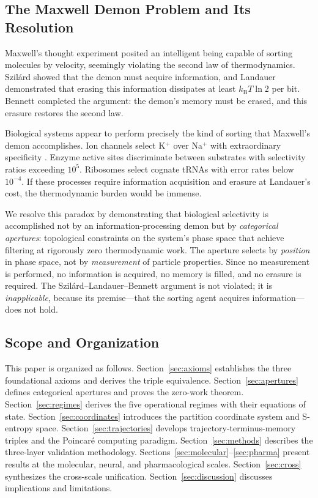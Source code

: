 \documentclass[twocolumn,10pt]{article}
\newcommand{\kB}{k_{\mathrm{B}}}
\begin{document}
\subsection{The Maxwell Demon Problem and Its Resolution}

Maxwell's thought experiment \citep{maxwell1871theory} posited an intelligent being capable of sorting molecules by velocity, seemingly violating the second law of thermodynamics.  Szil\'ard \citep{szilard1929entropieverminderung} showed that the demon must acquire information, and Landauer \citep{landauer1961irreversibility} demonstrated that erasing this information dissipates at least $\kB T \ln 2$ per bit.  Bennett \citep{bennett1982thermodynamics} completed the argument: the demon's memory must be erased, and this erasure restores the second law.

Biological systems appear to perform precisely the kind of sorting that Maxwell's demon accomplishes.  Ion channels select K$^{+}$ over Na$^{+}$ with extraordinary specificity \citep{doyle1998structure, hille2001ion}.  Enzyme active sites discriminate between substrates with selectivity ratios exceeding $10^{5}$.  Ribosomes select cognate tRNAs with error rates below $10^{-4}$.  If these processes require information acquisition and erasure at Landauer's cost, the thermodynamic burden would be immense.

We resolve this paradox by demonstrating that biological selectivity is accomplished not by an information-processing demon but by \emph{categorical apertures}: topological constraints on the system's phase space that achieve filtering at rigorously zero thermodynamic work.  The aperture selects by \emph{position} in phase space, not by \emph{measurement} of particle properties.  Since no measurement is performed, no information is acquired, no memory is filled, and no erasure is required.  The Szil\'ard--Landauer--Bennett argument is not violated; it is \emph{inapplicable}, because its premise---that the sorting agent acquires information---does not hold.

\subsection{Scope and Organization}

This paper is organized as follows.  Section~\ref{sec:axioms} establishes the three foundational axioms and derives the triple equivalence.  Section~\ref{sec:apertures} defines categorical apertures and proves the zero-work theorem.  Section~\ref{sec:regimes} derives the five operational regimes with their equations of state.  Section~\ref{sec:coordinates} introduces the partition coordinate system and S-entropy space.  Section~\ref{sec:trajectories} develops trajectory-terminus-memory triples and the Poincar\'e computing paradigm.  Section~\ref{sec:methods} describes the three-layer validation methodology.  Sections~\ref{sec:molecular}--\ref{sec:pharma} present results at the molecular, neural, and pharmacological scales.  Section~\ref{sec:cross} synthesizes the cross-scale unification.  Section~\ref{sec:discussion} discusses implications and limitations.
\end{document}
